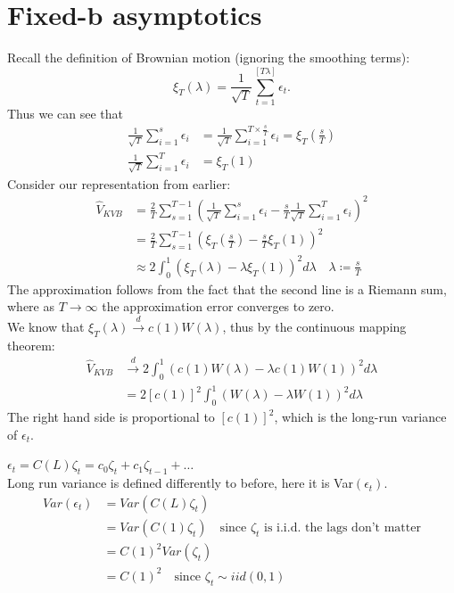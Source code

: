 \documentclass[DIV=14,titlepage=false]{scrreprt}
\begin{document}
\section{Fixed-b asymptotics}
Recall the definition of Brownian motion (ignoring the smoothing terms): \[ \xi_T(\lambda) = \frac{1}{\sqrt{T}} \sum_{t=1}^{[T\lambda]} \epsilon_t.\]
Thus we can see that
\begin{align*}
    \frac{1}{\sqrt{T}}\sum_{i=1}^{s}\epsilon_i  &= \frac{1}{\sqrt{T}}\sum_{i=1}^{T\times \frac{s}{T}}\epsilon_i
    = \xi_T(\frac{s}{T})\\
    \frac{1}{\sqrt{T}} \sum_{i=1}^{T}\epsilon_i &= \xi_T(1)
\end{align*}
Consider our representation from earlier:
\begin{align*}
    \hat V_{KVB} &= \frac{2}{T} \sum_{s=1}^{T-1} \left(\frac{1}{\sqrt{T}}\sum_{i=1}^{s}\epsilon_i -\frac{s}{T}\frac{1}{\sqrt{T}} \sum_{i=1}^{T}\epsilon_i\right)^2\\
    &= \frac{2}{T} \sum_{s=1}^{T-1} \left(\xi_T(\frac{s}{T}) -\frac{s}{T}\xi_T(1)\right)^2\\
    &\approx 2 \int_{0}^{1} \left(\xi_T(\lambda) -\lambda\xi_T(1)\right)^2 d \lambda \quad \lambda \coloneqq \frac{s}{T}
\end{align*}
The approximation follows from the fact that the second line is a Riemann sum, where as $T \to \infty$ the approximation error converges to zero.\\
We know that $\xi_T(\lambda) \xrightarrow{d} c(1)W(\lambda)$, thus by the continuous mapping theorem:
\begin{align*}
    \hat V_{KVB} &\xrightarrow{d} 2 \int_{0}^{1} \left(c(1)W(\lambda) -\lambda c(1)W(1)\right)^2 d \lambda\\
    &= 2 [c(1)]^2 \int_{0}^{1} \left(W(\lambda) -\lambda W(1)\right)^2 d \lambda
\end{align*}
The right hand side is proportional to $[c(1)]^2$, which is the long-run variance of $\epsilon_t$.\\
\begin{example}
    $\epsilon_t=C(L)\zeta_t = c_0 \zeta_t + c_1 \zeta_{t-1} + \dots$\\
    Long run variance is defined differently to before, here it is Var$(\epsilon_t)$.
    \begin{align*}
        Var(\epsilon_t) &= Var(C(L)\zeta_t)\\
        &= Var(C(1)\zeta_t) \quad \text{since $\zeta_t$ is i.i.d. the lags don't matter}\\
        &= C(1)^2 Var(\zeta_t)\\
        &= C(1)^2 \quad \text{since $\zeta_t \sim iid(0,1)$}
    \end{align*}
\end{example}
\end{document}
